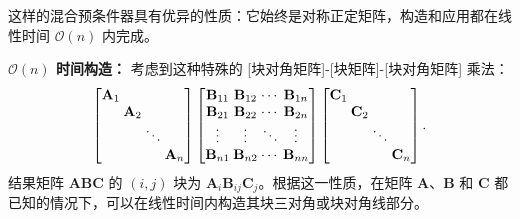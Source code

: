 这样的混合预条件器具有优异的性质：它始终是对称正定矩阵，构造和应用都在线性时间 $\mathcal{O}(n)$ 内完成。

\textbf{$\mathcal{O}(n)$ 时间构造：} 考虑到这种特殊的 [块对角矩阵]-[块矩阵]-[块对角矩阵] 乘法：
\begin{equation}
  \label{eq:bmb_multiplication}
  \setlength{\arraycolsep}{1.2pt}
  \begin{bmatrix}
    \mathbf{A}_{1} &                &        &                \\
                   & \mathbf{A}_{2} &        &                \\
                   &                & \ddots &                \\
                   &                &        & \mathbf{A}_{n}
  \end{bmatrix}
  \begin{bmatrix}
    \mathbf{B}_{11} & \mathbf{B}_{12} & \cdots & \mathbf{B}_{1n} \\
    \mathbf{B}_{21} & \mathbf{B}_{22} & \cdots & \mathbf{B}_{2n} \\
    \vdots          & \vdots          & \ddots & \vdots          \\
    \mathbf{B}_{n1} & \mathbf{B}_{n2} & \cdots & \mathbf{B}_{nn} \\
  \end{bmatrix}
  \begin{bmatrix}
    \mathbf{C}_{1} &                &        &                \\
                   & \mathbf{C}_{2} &        &                \\
                   &                & \ddots &                \\
                   &                &        & \mathbf{C}_{n}
  \end{bmatrix}.
\end{equation}
结果矩阵 $\mathbf A \mathbf B \mathbf C$ 的 $(i, j)$ 块为 $\mathbf{A}_{i} \mathbf{B}_{ij} \mathbf{C}_{j}$。根据这一性质，在矩阵 $\mathbf A$、$\mathbf B$ 和 $\mathbf C$ 都已知的情况下，可以在线性时间内构造其块三对角或块对角线部分。

